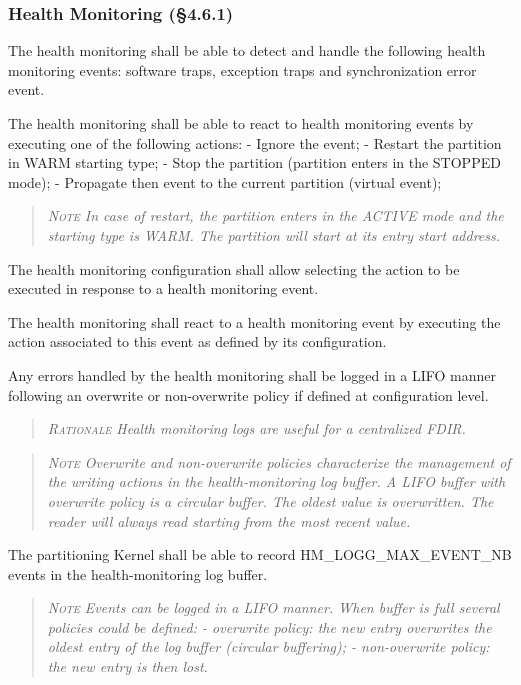 \subsubsection{Health Monitoring (\S4.6.1)}

The health monitoring shall be able to detect and handle the following health monitoring events: software traps, exception traps and synchronization error event.

The health monitoring shall be able to react to health monitoring events by executing one of the following actions:
- Ignore the event;
- Restart the partition in WARM starting type;
- Stop the partition (partition enters in the STOPPED mode);
- Propagate then event to the current partition (virtual event);
\begin{quote}\it
\textsc{Note}
In case of restart, the partition enters in the ACTIVE mode and the starting type is WARM. The partition will start at its entry start address.
\end{quote}

The health monitoring configuration shall allow selecting the action to be executed in response to a health monitoring event.

The health monitoring shall react to a health monitoring event by executing the action associated to this event as defined by its configuration.

Any errors handled by the health monitoring shall be logged in a LIFO manner following an overwrite or non-overwrite policy if defined at configuration level.
\begin{quote}\it
\textsc{Rationale}
Health monitoring logs are useful for a centralized FDIR.
\end{quote}
\begin{quote}\it
\textsc{Note}
Overwrite and non-overwrite policies characterize the management of the writing actions in the health-monitoring log buffer. A LIFO buffer with overwrite policy is a circular buffer. The oldest value is overwritten. The reader will always read starting from the most recent value.
\end{quote}

The partitioning Kernel shall be able to record HM\_LOGG\_MAX\_EVENT\_NB events in the health-monitoring log buffer.
\begin{quote}\it
\textsc{Note}
Events can be logged in a LIFO manner. When buffer is full several policies could be defined:
- overwrite policy: the new entry overwrites the oldest entry of the log buffer (circular buffering);
- non-overwrite policy: the new entry is then lost.
\end{quote}

